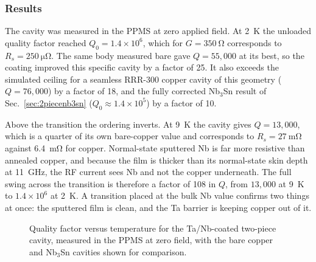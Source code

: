 \subsubsection{Results}

The cavity was measured in the PPMS at zero applied field. At \qty{2}{\kelvin} the unloaded quality factor reached $Q_0 = 1.4\times10^{6}$, which for $G = \qty{350}{\ohm}$ corresponds to $R_s = \qty{250}{\micro\ohm}$. The same body measured bare gave $Q = 55{,}000$ at its best, so the coating improved this specific cavity by a factor of \num{25}. It also exceeds the simulated ceiling for a seamless RRR-300 copper cavity of this geometry ($Q = 76{,}000$) by a factor of \num{18}, and the fully corrected Nb$_3$Sn result of Sec.~\ref{sec:2piecenb3sn} ($Q_0 \approx 1.4\times10^{5}$) by a factor of \num{10}.

Above the transition the ordering inverts. At \qty{9}{\kelvin} the cavity gives $Q = 13{,}000$, which is a quarter of its own bare-copper value and corresponds to $R_s = \qty{27}{\milli\ohm}$ against \qty{6.4}{\milli\ohm} for copper. Normal-state sputtered Nb is far more resistive than annealed copper, and because the film is thicker than its normal-state skin depth at \qty{11}{\giga\hertz}, the RF current sees Nb and not the copper underneath. The full swing across the transition is therefore a factor of \num{108} in $Q$, from $13{,}000$ at \qty{9}{\kelvin} to $1.4\times10^{6}$ at \qty{2}{\kelvin}. A transition placed at the bulk Nb value confirms two things at once: the sputtered film is clean, and the Ta barrier is keeping copper out of it.

\begin{figure}[htb]
    \centering
    \caption{Quality factor versus temperature for the Ta/Nb-coated two-piece cavity, measured in the PPMS at zero field, with the bare copper and Nb$_3$Sn cavities shown for comparison. }
    \label{fig:tanbQvsT}
\end{figure}


